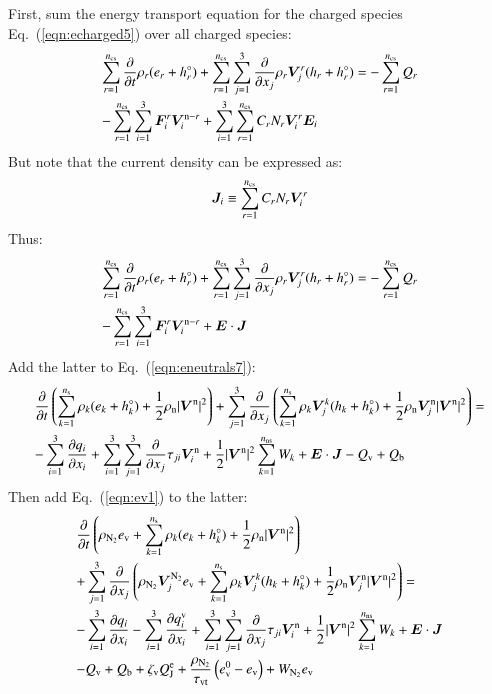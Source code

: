 \documentclass{warpdoc}
\newcommand{\alb}{\vspace{0.1cm}\\} %
\newcommand{\mfd}{\displaystyle}
\newcommand{\ns}{{n_{\rm s}}}
\newcommand{\nns}{{n_{\rm ns}}}
\newcommand{\ncs}{{n_{\rm cs}}}
\newcommand{\ev}{{e_{\rm v}}}
\newcommand{\evzero}{{e_{\rm v}^0}}
\newcommand{\tauvt}{\tau_{\rm vt}}
\renewcommand{\vec}[1]{\bm{#1}}
\begin{document}
First, sum the energy transport equation for the charged species Eq.\ (\ref{eqn:echarged5}) over all charged species:
%
\begin{equation}
\begin{array}{l}\mfd
\sum_{r=1}^\ncs \frac{\partial }{\partial t}\rho_r (e_r+h_r^\circ) 
+ \sum_{r=1}^\ncs \sum_{j=1}^3  \frac{\partial }{\partial x_j} \rho_r \vec{V}^r_j (h_r+h_r^\circ) 
= 
- \sum_{r=1}^\ncs Q_{r} \alb\mfd
-\sum_{r=1}^\ncs \sum_{i=1}^3 \vec{F}_i^r \vec{V}_i^{{\rm n}-r} 
+ \sum_{i=1}^3 \sum_{r=1}^\ncs  C_r N_r  \vec{V}^r_i \vec{E}_i
\end{array}
\end{equation}
%  
But note that the current density can be expressed as:
%
\begin{equation}
 \vec{J}_i \equiv \sum_{r=1}^\ncs  C_r N_r  \vec{V}^r_i
\end{equation}
%
Thus:
%
\begin{equation}
\begin{array}{l}\mfd
\sum_{r=1}^\ncs \frac{\partial }{\partial t}\rho_r (e_r+h_r^\circ) 
+ \sum_{r=1}^\ncs \sum_{j=1}^3  \frac{\partial }{\partial x_j} \rho_r \vec{V}^r_j (h_r+h_r^\circ) 
= 
- \sum_{r=1}^\ncs Q_{r}\alb\mfd
-\sum_{r=1}^\ncs \sum_{i=1}^3 \vec{F}_i^r \vec{V}_i^{{\rm n}-r} 
+ \vec{E}\cdot\vec{J}
\end{array}
\end{equation}
%  
Add the latter to Eq.\ (\ref{eqn:eneutrals7}):
%
\begin{equation}
\begin{array}{l}\mfd
 \frac{\partial }{\partial t}\left(\sum_{k=1}^\ns \rho_k (e_k+h_k^\circ)+\frac{1}{2}\rho_{\rm n}|\vec{V}^{\rm n}|^2 \right) 
+ \sum_{j=1}^3  \frac{\partial }{\partial x_j} \left(\sum_{k=1}^\ns \rho_k \vec{V}^k_j (h_k+h_k^\circ)+\frac{1}{2}\rho_{\rm n}\vec{V}^{\rm n}_j|\vec{V}^{\rm n}|^2 \right)
= \alb\mfd
-\sum_{i=1}^{3}\frac{\partial q_i}{\partial x_i}
+\sum_{i=1}^3 \sum_{j=1}^3  \frac{\partial }{\partial x_j} \tau_{ji} \vec{V}_i^{\rm n}
+\frac{1}{2}|\vec{V}^{\rm n}|^2 \sum_{k=1}^\nns W_k
+ \vec{E}\cdot\vec{J}
-  Q_{\rm v}
+ Q_{\rm b}
\end{array}
\end{equation}
%  
Then add Eq.\ (\ref{eqn:ev1}) to the latter:
%
\begin{equation}
\begin{array}{l}\mfd
 \frac{\partial }{\partial t}\left(\rho_{\rm N_2} \ev+\sum_{k=1}^\ns \rho_k (e_k+h_k^\circ)+\frac{1}{2}\rho_{\rm n}|\vec{V}^{\rm n}|^2 \right)\alb\mfd 
+ \sum_{j=1}^3  \frac{\partial }{\partial x_j} \left(\rho_{\rm N_2} \vec{V}_j^{\rm N_2} \ev + \sum_{k=1}^\ns \rho_k \vec{V}^k_j (h_k+h_k^\circ)+\frac{1}{2}\rho_{\rm n}\vec{V}^{\rm n}_j|\vec{V}^{\rm n}|^2 \right)
= \alb\mfd
-\sum_{i=1}^{3}\frac{\partial q_i}{\partial x_i}
-\sum_{i=1}^{3}\frac{\partial q_i^{\rm v}}{\partial x_i}
+\sum_{i=1}^3 \sum_{j=1}^3  \frac{\partial }{\partial x_j} \tau_{ji} \vec{V}_i^{\rm n}
+\frac{1}{2}|\vec{V}^{\rm n}|^2 \sum_{k=1}^\nns W_k
+ \vec{E}\cdot\vec{J}
\alb\mfd
-  Q_{\rm v}
+ Q_{\rm b}
+ \zeta_{\rm v} Q_{\rm J}^{\rm e}   
+ {\frac{\rho_{\rm N_2}}{\tauvt}}\left( \evzero-\ev \right) + W_{\rm N_2} \ev
\end{array}
\end{equation}
\end{document}
